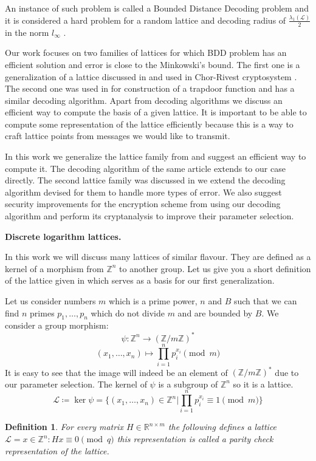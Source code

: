 \documentclass[12pt]{article}
\newcommand{\ZZ}{\mathbb{Z}}
\newcommand{\LL}{\mathcal{L}}
\newtheorem{definition}{Definition}
\begin{document}
An instance of such problem is called a Bounded Distance Decoding problem and it is considered a hard problem for a random lattice and decoding radius of $\frac{\lambda_{1}(\LL)}{2}$ in the norm $l_{\infty}$ \cite{[LM09]}.

Our work focuses on two families of lattices for which BDD problem has an efficient solution and error is close to the Minkowski's bound. The first one is a generalization of a lattice discussed in \cite{[DP19]} and used in Chor-Rivest cryptosystem \cite{[CR88]}. The second one was used in \cite{[LLXY17]} for construction of a trapdoor function and has a similar decoding algorithm. Apart from decoding algorithms we discuss an efficient way to compute the basis of a given lattice. It is important to be able to compute some representation of the lattice efficiently because this is a way to craft lattice points from messages we would like to transmit.

In this work we generalize the lattice family from \cite{[DP19]} and suggest an efficient way to compute it. The decoding algorithm of the same article extends to our case directly. The second lattice family was discussed in \cite{[LLXY17]} we extend the decoding algorithm devised for them to handle more types of error. We also suggest security improvements for the encryption scheme from \cite{[LLXY17]} using our decoding algorithm and perform its cryptanalysis to improve their parameter selection.

\textbf{Discrete logarithm lattices.}

In this work we will discuss many lattices of similar flavour. They are defined as a kernel of a morphism from $\ZZ^{n}$ to another group. Let us give you a short definition of the lattice given in \cite{[DP19]} which serves as a basis for our first generalization.

Let us consider numbers $m$ which is a prime power, $n$ and $B$ such that we can find $n$ primes $p_{1}, \dots , p_{n}$ which do not divide $m$ and are bounded by $B$. We consider a group morphism:
\[
    \psi : \ZZ^{n} \rightarrow (\ZZ/m\ZZ)^*
\]
\[
    (x_{1}, \dots, x_{n}) \mapsto \prod_{i=1}^{n}p_{i}^{x_{i}} \pmod{m}
\]
It is easy to see that the image will indeed be an element of $(\ZZ/m\ZZ)^*$ due to our parameter selection. The kernel of $\psi$ is a subgroup of $\ZZ^{n}$ so it is a lattice.
\[
    \LL \coloneqq \ker \psi = \{(x_{1}, \dots, x_{n}) \in \ZZ^{n} | \prod_{i=1}^{n}p_{i}^{x_{i}} \equiv 1 \pmod{m}\}
\]

\begin{definition}
For every matrix $H \in \mathbb{R}^{n \times m}$ the following defines a lattice$\LL = {x \in \ZZ^{n}: Hx \equiv 0 \pmod{q}}$ this representation is called a parity check representation of the lattice.
\end{definition}
\end{document}
